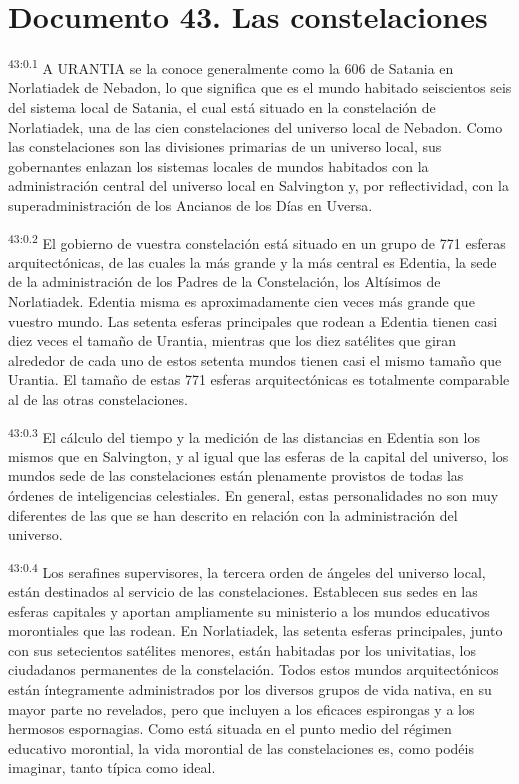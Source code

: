 \chapter{Documento 43. Las constelaciones}
\par
\textsuperscript{43:0.1} A URANTIA se la conoce generalmente como la 606 de Satania en Norlatiadek de Nebadon, lo que significa que es el mundo habitado seiscientos seis del sistema local de Satania, el cual está situado en la constelación de Norlatiadek, una de las cien constelaciones del universo local de Nebadon. Como las constelaciones son las divisiones primarias de un universo local, sus gobernantes enlazan los sistemas locales de mundos habitados con la administración central del universo local en Salvington y, por reflectividad, con la superadministración de los Ancianos de los Días en Uversa.

\par
\textsuperscript{43:0.2} El gobierno de vuestra constelación está situado en un grupo de 771 esferas arquitectónicas, de las cuales la más grande y la más central es Edentia, la sede de la administración de los Padres de la Constelación, los Altísimos de Norlatiadek. Edentia misma es aproximadamente cien veces más grande que vuestro mundo. Las setenta esferas principales que rodean a Edentia tienen casi diez veces el tamaño de Urantia, mientras que los diez satélites que giran alrededor de cada uno de estos setenta mundos tienen casi el mismo tamaño que Urantia. El tamaño de estas 771 esferas arquitectónicas es totalmente comparable al de las otras constelaciones.

\par
\textsuperscript{43:0.3} El cálculo del tiempo y la medición de las distancias en Edentia son los mismos que en Salvington, y al igual que las esferas de la capital del universo, los mundos sede de las constelaciones están plenamente provistos de todas las órdenes de inteligencias celestiales. En general, estas personalidades no son muy diferentes de las que se han descrito en relación con la administración del universo.

\par
\textsuperscript{43:0.4} Los serafines supervisores, la tercera orden de ángeles del universo local, están destinados al servicio de las constelaciones. Establecen sus sedes en las esferas capitales y aportan ampliamente su ministerio a los mundos educativos morontiales que las rodean. En Norlatiadek, las setenta esferas principales, junto con sus setecientos satélites menores, están habitadas por los univitatias, los ciudadanos permanentes de la constelación. Todos estos mundos arquitectónicos están íntegramente administrados por los diversos grupos de vida nativa, en su mayor parte no revelados, pero que incluyen a los eficaces espirongas y a los hermosos espornagias. Como está situada en el punto medio del régimen educativo morontial, la vida morontial de las constelaciones es, como podéis imaginar, tanto típica como ideal.

